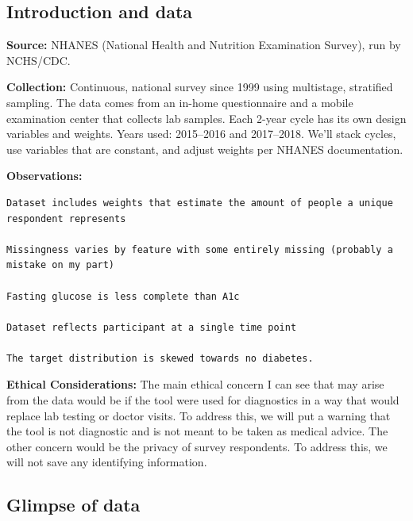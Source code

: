 \documentclass[
  letterpaper,
  DIV=11,
  numbers=noendperiod]{scrartcl}
\begin{document}
\subsection{Introduction and data}\label{introduction-and-data-2}

\textbf{Source:} NHANES (National Health and Nutrition Examination
Survey), run by NCHS/CDC.

\textbf{Collection:} Continuous, national survey since 1999 using
multistage, stratified sampling. The data comes from an in-home
questionnaire and a mobile examination center that collects lab samples.
Each 2-year cycle has its own design variables and weights. Years used:
2015--2016 and 2017--2018. We'll stack cycles, use variables that are
constant, and adjust weights per NHANES documentation.

\textbf{Observations:}

\begin{verbatim}
Dataset includes weights that estimate the amount of people a unique respondent represents 

Missingness varies by feature with some entirely missing (probably a mistake on my part)

Fasting glucose is less complete than A1c

Dataset reflects participant at a single time point 

The target distribution is skewed towards no diabetes.
\end{verbatim}

\textbf{Ethical Considerations:} The main ethical concern I can see that
may arise from the data would be if the tool were used for diagnostics
in a way that would replace lab testing or doctor visits. To address
this, we will put a warning that the tool is not diagnostic and is not
meant to be taken as medical advice. The other concern would be the
privacy of survey respondents. To address this, we will not save any
identifying information.

\subsection{Glimpse of data}\label{glimpse-of-data-2}
\end{document}
